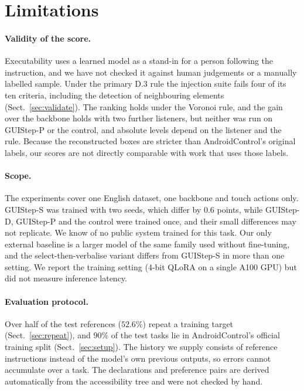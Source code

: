 \documentclass[runningheads,a4paper]{llncs}
\begin{document}
\section{Limitations}
\label{sec:limits}

\paragraph{Validity of the score.}
Executability uses a learned model as a stand-in for a person following the instruction, and we have not checked it against human judgements or a manually labelled sample. Under the primary D.3 rule the injection suite fails four of its ten criteria, including the detection of neighbouring elements (Sect.~\ref{sec:validate}). The ranking holds under the Voronoi rule, and the gain over the backbone holds with two further listeners, but neither was run on \mbox{GUIStep-P} or the control, and absolute levels depend on the listener and the rule. Because the reconstructed boxes are stricter than AndroidControl's original labels, our scores are not directly comparable with work that uses those labels.

\paragraph{Scope.}
The experiments cover one English dataset, one backbone and touch actions only. \mbox{GUIStep-S} was trained with two seeds, which differ by $0.6$ points, while \mbox{GUIStep-D}, \mbox{GUIStep-P} and the control were trained once, and their small differences may not replicate. We know of no public system trained for this task. Our only external baseline is a larger model of the same family used without fine-tuning, and the select-then-verbalise variant differs from \mbox{GUIStep-S} in more than one setting. We report the training setting (4-bit QLoRA on a single A100 GPU) but did not measure inference latency.

\paragraph{Evaluation protocol.}
Over half of the test references ($52.6\%$) repeat a training target (Sect.~\ref{sec:repeat}), and $90\%$ of the test tasks lie in AndroidControl's official training split (Sect.~\ref{sec:setup}). The history we supply consists of reference instructions instead of the model's own previous outputs, so errors cannot accumulate over a task. The declarations and
preference pairs are derived automatically from the accessibility tree and were not checked by hand.
\end{document}
